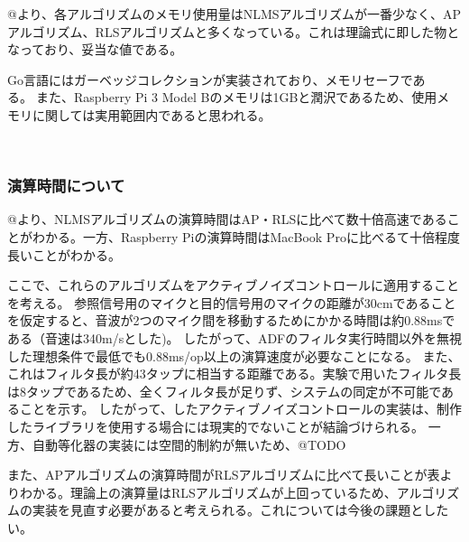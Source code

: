 @より、各アルゴリズムのメモリ使用量はNLMSアルゴリズムが一番少なく、APアルゴリズム、RLSアルゴリズムと多くなっている。これは理論式に即した物となっており、妥当な値である。

Go言語にはガーベッジコレクションが実装されており、メモリセーフである。また、Raspberry
Pi 3 Model
Bのメモリは1GBと潤沢であるため、使用メモリに関しては実用範囲内であると思われる。

\
\subsubsection{演算時間について}\label{about-time}

@より、NLMSアルゴリズムの演算時間はAP・RLSに比べて数十倍高速であることがわかる。一方、Raspberry
Piの演算時間はMacBook Proに比べるて十倍程度長いことがわかる。

ここで、これらのアルゴリズムをアクティブノイズコントロールに適用することを考える。
参照信号用のマイクと目的信号用のマイクの距離が30cmであることを仮定すると、音波が2つのマイク間を移動するためにかかる時間は約0.88msである（音速は340m/sとした)。
したがって、ADFのフィルタ実行時間以外を無視した理想条件で最低でも0.88ms/op以上の演算速度が必要なことになる。
また、これはフィルタ長が約43タップに相当する距離である。実験で用いたフィルタ長は8タップであるため、全くフィルタ長が足りず、システムの同定が不可能であることを示す。
したがって、したアクティブノイズコントロールの実装は、制作したライブラリを使用する場合には現実的でないことが結論づけられる。
一方、自動等化器の実装には空間的制約が無いため、@TODO

また、APアルゴリズムの演算時間がRLSアルゴリズムに比べて長いことが表よりわかる。理論上の演算量はRLSアルゴリズムが上回っているため、アルゴリズムの実装を見直す必要があると考えられる。これについては今後の課題としたい。
